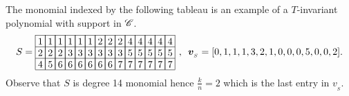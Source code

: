 The monomial indexed by the following tableau is an example of a $T$-invariant polynomial with support in \(\mathscr{C}\).
\[S = 
    \begin{array}[c]{*{14}c}\cline{1-14}
    \lr{1}&\lr{1}&\lr{1}&\lr{1}&\lr{1}&\lr{1}&\lr{2}&\lr{2}&\lr{2}&\lr{4}&\lr{4}&\lr{4}&\lr{4}&\lr{4}\\\cline{1-14}
    \lr{2}&\lr{2}&\lr{2}&\lr{3}&\lr{3}&\lr{3}&\lr{3}&\lr{3}&\lr{3}&\lr{5}&\lr{5}&\lr{5}&\lr{5}&\lr{5}\\\cline{1-14}
    \lr{4}&\lr{5}&\lr{6}&\lr{6}&\lr{6}&\lr{6}&\lr{6}&\lr{6}&\lr{7}&\lr{7}&\lr{7}&\lr{7}&\lr{7}&\lr{7}\\\cline{1-14}
    \end{array}
    \hspace{4pt}, \hspace{5pt}
    \VEC{v}_{_{S}} = [0, 1, 1, 1, 3, 2, 1, 0, 0, 0, 5, 0, 0, 2].
\]
Observe that \(S\) is degree 14 monomial hence \(\frac{k}{n} = 2 \) which is the last entry in \(v_{_S}\).  
